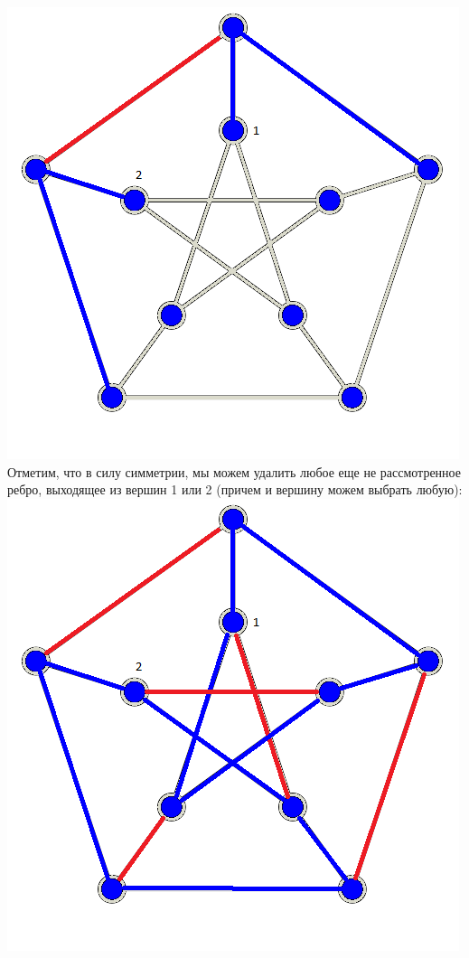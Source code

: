 \documentclass[10pt,a4paper]{article}
\begin{document}
\begin{enumerate}
\begin{enumerate}
	\includegraphics[scale=0.5]{petersen_1.png}\\
	Отметим, что в силу симметрии, мы можем удалить любое еще не рассмотренное ребро, выходящее из вершин 1 или 2 (причем и вершину можем выбрать любую):\\
	\includegraphics[scale=0.5]{petersen_2.png}\\

\end{enumerate}
\end{enumerate}
\end{document}
